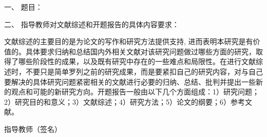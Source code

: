 \newpage

\thispagestyle{empty}

{
\setlength{\parindent}{0em}
\renewcommand{\baselinestretch}{2}
{\songti\sihao\bfseries

一、 \; 题目： \; \underline{\makebox[24em]{\zjutitlec}}

\vspace{2em}

二、 \; 指导教师对文献综述和开题报告的具体内容要求： \\ \par
}
{
  \songti\xiaosi 


文献综述的主要目的是为论文的写作和研究方法提供支持, 进而表明本研究是有价值的。具体要求归纳和总结国内外相关文献对该研究问题做过哪些方面的研究，取得了哪些阶段性的成果，以及既有研究中存在的一些难点和局限性。在进行文献综述时，不要只是简单罗列之前的研究成果，而是要紧扣自己的研究内容，对与自己要解决的具体研究问题紧密相关的文献进行必要的归纳、总结、批判并提出一些新的观点和可能的新研究方向。开题报告一般由以下几个方面组成：1）研究问题；2）研究目的和意义；3）文献综述；4）研究方法；5）论文的纲要；6）参考文献。
}

\vspace{9cm}

}
{
\songti\xiaosi\bfseries
\begin{flushright}
  指导教师（签名） \; \underline{\hspace{6em}} \\
\end{flushright}
}

